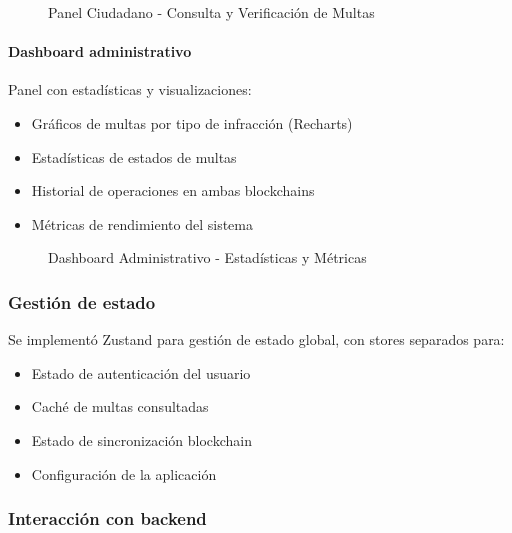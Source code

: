 \begin{figure}[htbp]
    \centering
    \caption{Panel Ciudadano - Consulta y Verificación de Multas}
    \label{fig:ui_panel_ciudadano}
\end{figure}

\paragraph{Dashboard administrativo}
Panel con estadísticas y visualizaciones:
\begin{itemize}
    \item Gráficos de multas por tipo de infracción (Recharts)
    \item Estadísticas de estados de multas
    \item Historial de operaciones en ambas blockchains
    \item Métricas de rendimiento del sistema
\end{itemize}

\begin{figure}[htbp]
    \centering
    \caption{Dashboard Administrativo - Estadísticas y Métricas}
    \label{fig:ui_dashboard}
\end{figure}

\subsubsection{Gestión de estado}

Se implementó Zustand para gestión de estado global, con stores separados para:
\begin{itemize}
    \item Estado de autenticación del usuario
    \item Caché de multas consultadas
    \item Estado de sincronización blockchain
    \item Configuración de la aplicación
\end{itemize}

\subsubsection{Interacción con backend}

